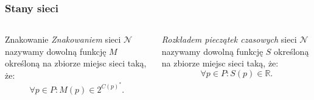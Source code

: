 \documentclass{beamer}
\begin{document}



\begin{frame}
\frametitle{Stany sieci}

\begin{columns}
\column{5cm}

\begin{block}{Znakowanie}
{\em Znakowaniem} sieci $\mathcal{N}$ nazywamy dowolną funkcję $M$ określoną na zbiorze miejsc sieci taką, że:
 \begin{equation} 
\label{eq:znakowanie2}
\forall p \in P \colon M(p) \in 2^{C(p)^*}.
\end{equation}
\end{block}

\pause

\column{5cm}
\begin{block}{}
{\em Rozkładem pieczątek czasowych} sieci $\mathcal{N}$ nazywamy dowolną funkcję $S$ określoną na zbiorze miejsc sieci taką, że: 
\begin{equation}
\label{eq:rozkladPieczatek2}
\forall p \in P \colon S(p) \in \mathbb{R}.
\end{equation}
\end{block}
\end{columns}

\end{frame}

\end{document}
